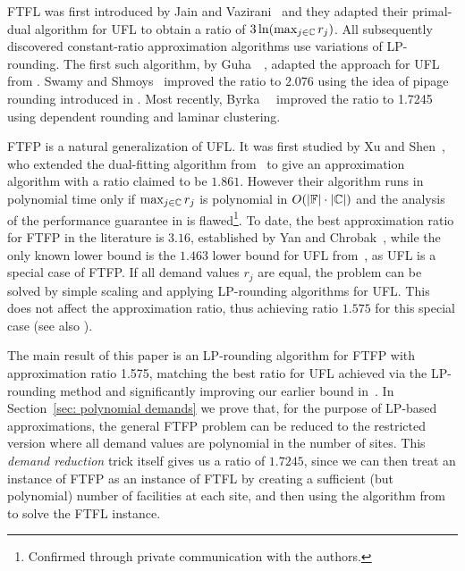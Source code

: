 FTFL was first introduced by Jain and
Vazirani~\cite{JainV03} and they adapted their primal-dual
algorithm for UFL to obtain a ratio of
$3\ln(\max_{j\in\mathbb{C}}r_j)$.  All subsequently
discovered constant-ratio approximation algorithms use
variations of LP-rounding.  The first such algorithm, by
Guha~{\etal}~\cite{GuhaMM01}, adapted the approach for UFL
from \cite{ShmoysTA97}.  Swamy and Shmoys~\cite{SwamyS08}
improved the ratio to $2.076$ using the idea of pipage
rounding introduced in \cite{Svi02}. Most recently,
Byrka~{\etal}~\cite{ByrkaSS10} improved the ratio to 1.7245
using dependent rounding and laminar clustering.

FTFP is a natural generalization of UFL. It was first
studied by Xu and Shen~\cite{XuS09}, who extended the
dual-fitting algorithm from~\cite{JainMMSV03} to give an
approximation algorithm with a ratio claimed to be
$1.861$. However their algorithm runs in polynomial time
only if $\max_{j\in\mathbb{C}} r_j$ is polynomial in
$O(|\mathbb{F}|\cdot |\mathbb{C}|)$ and the analysis of the
performance guarantee in \cite{XuS09} is flawed\footnote{Confirmed through
  private communication with the authors.}.  To date, the
best approximation ratio for FTFP in the literature is $3.16$,
established by Yan and Chrobak~\cite{YanC11}, while the only
known lower bound is the $1.463$ lower bound for UFL
from~\cite{GuhaK98}, as UFL is a special case of FTFP.
If all demand values $r_j$ are equal, the problem can be solved
by simple scaling and applying LP-rounding algorithms for UFL. This does
not affect the approximation ratio, thus achieving ratio $1.575$ for this
special case (see also \cite{LiaoShen11}).

\smallskip

The main result of this paper is an LP-rounding algorithm
for FTFP with approximation ratio 1.575, matching the best
ratio for UFL achieved via the LP-rounding method
\cite{ByrkaGS10} and significantly improving our earlier
bound in~\cite{YanC11}. In Section~\ref{sec: polynomial
  demands} we prove that, for the purpose of LP-based
approximations, the general FTFP problem can be reduced to
the restricted version where all demand values are
polynomial in the number of sites.  This \emph{demand
  reduction} trick itself gives us a ratio of $1.7245$,
since we can then treat an instance of FTFP as an instance
of FTFL by creating a sufficient (but polynomial) number of
facilities at each site, and then using the algorithm
from~\cite{ByrkaSS10} to solve the FTFL instance.

